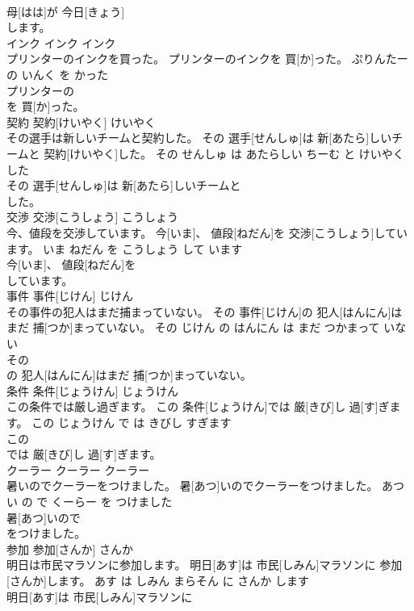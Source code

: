 \documentclass[8pt]{extreport}
\begin{document}
\begin{CJK}{UTF8}{min}
\\	母[はは]が 今日[きょう]
\\	します。		
\\	インク	インク	インク	
\\	プリンターのインクを買った。	プリンターのインクを 買[か]った。	ぷりんたー の いんく を かった	
\\	プリンターの
\\	を 買[か]った。		
\\	契約	契約[けいやく]	けいやく	
\\	その選手は新しいチームと契約した。	その 選手[せんしゅ]は 新[あたら]しいチームと 契約[けいやく]した。	その せんしゅ は あたらしい ちーむ と けいやく した	
\\	その 選手[せんしゅ]は 新[あたら]しいチームと
\\	した。		
\\	交渉	交渉[こうしょう]	こうしょう	
\\	今、値段を交渉しています。	今[いま]、 値段[ねだん]を 交渉[こうしょう]しています。	いま ねだん を こうしょう して います	
\\	今[いま]、 値段[ねだん]を
\\	しています。		
\\	事件	事件[じけん]	じけん	
\\	その事件の犯人はまだ捕まっていない。	その 事件[じけん]の 犯人[はんにん]はまだ 捕[つか]まっていない。	その じけん の はんにん は まだ つかまって いない	
\\	その
\\	の 犯人[はんにん]はまだ 捕[つか]まっていない。		
\\	条件	条件[じょうけん]	じょうけん	
\\	この条件では厳し過ぎます。	この 条件[じょうけん]では 厳[きび]し 過[す]ぎます。	この じょうけん で は きびし すぎます	
\\	この
\\	では 厳[きび]し 過[す]ぎます。		
\\	クーラー	クーラー	クーラー	
\\	暑いのでクーラーをつけました。	暑[あつ]いのでクーラーをつけました。	あつい の で くーらー を つけました	
\\	暑[あつ]いので
\\	をつけました。		
\\	参加	参加[さんか]	さんか	
\\	明日は市民マラソンに参加します。	明日[あす]は 市民[しみん]マラソンに 参加[さんか]します。	あす は しみん まらそん に さんか します	
\\	明日[あす]は 市民[しみん]マラソンに

\end{CJK}
\end{document}
